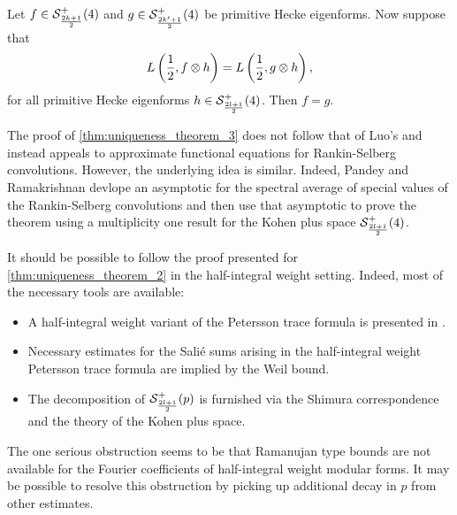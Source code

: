 \documentclass[12pt,reqno,oneside]{amsart}
\begin{document}
    \begin{theorem}\label{thm:uniqueness_theorem_3}
        Let $f \in \mathcal{S}_{\frac{2k+1}{2}}^{+}(4)$ and $g \in \mathcal{S}_{\frac{2k'+1}{2}}^{+}(4)$ be primitive Hecke eigenforms. Now suppose that
        \[
            L\left(\frac{1}{2},f \otimes h\right) = L\left(\frac{1}{2},g \otimes h\right),
        \]
        for all primitive Hecke eigenforms $h \in \mathcal{S}_{\frac{2l+1}{2}}^{+}(4)$. Then $f = g$.
    \end{theorem}

    The proof of \cref{thm:uniqueness_theorem_3} does not follow that of Luo's and instead appeals to approximate functional equations for Rankin-Selberg convolutions. However, the underlying idea is similar. Indeed, Pandey and Ramakrishnan devlope an asymptotic for the spectral average of special values of the Rankin-Selberg convolutions and then use that asymptotic to prove the theorem using a multiplicity one result for the Kohen plus space $\mathcal{S}_{\frac{2l+1}{2}}^{+}(4)$.
    
    It should be possible to follow the proof presented for \cref{thm:uniqueness_theorem_2} in the half-integral weight setting. Indeed, most of the necessary tools are available:
    \begin{itemize}
        \item A half-integral weight variant of the Petersson trace formula is presented in \cite{CT}.
        \item Necessary estimates for the Sali\'e sums arising in the half-integral weight Petersson trace formula are implied by the Weil bound.
        \item The decomposition of $\mathcal{S}_{\frac{2l+1}{2}}^{+}(p)$ is furnished via the Shimura correspondence and the theory of the Kohen plus space.
    \end{itemize}
    The one serious obstruction seems to be that Ramanujan type bounds are not available for the Fourier coefficients of half-integral weight modular forms. It may be possible to resolve this obstruction by picking up additional decay in $p$ from other estimates.
\end{document}
